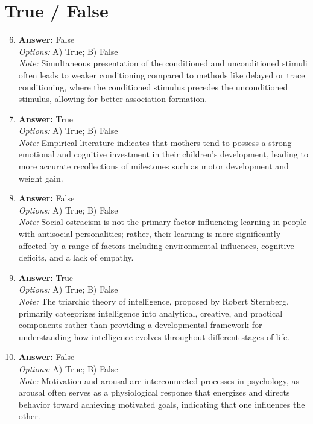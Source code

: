 \documentclass[12pt]{article}
\begin{document}
\section*{True / False}
\begin{enumerate}[label=\arabic*.]
\setcounter{enumi}{5}
\item \textbf{Answer:} False
\\ \textit{Options:} A) True; B) False
\\ \textit{Note:} Simultaneous presentation of the conditioned and unconditioned stimuli often leads to weaker conditioning compared to methods like delayed or trace conditioning, where the conditioned stimulus precedes the unconditioned stimulus, allowing for better association formation.
\item \textbf{Answer:} True
\\ \textit{Options:} A) True; B) False
\\ \textit{Note:} Empirical literature indicates that mothers tend to possess a strong emotional and cognitive investment in their children's development, leading to more accurate recollections of milestones such as motor development and weight gain.
\item \textbf{Answer:} False
\\ \textit{Options:} A) True; B) False
\\ \textit{Note:} Social ostracism is not the primary factor influencing learning in people with antisocial personalities; rather, their learning is more significantly affected by a range of factors including environmental influences, cognitive deficits, and a lack of empathy.
\item \textbf{Answer:} True
\\ \textit{Options:} A) True; B) False
\\ \textit{Note:} The triarchic theory of intelligence, proposed by Robert Sternberg, primarily categorizes intelligence into analytical, creative, and practical components rather than providing a developmental framework for understanding how intelligence evolves throughout different stages of life.
\item \textbf{Answer:} False
\\ \textit{Options:} A) True; B) False
\\ \textit{Note:} Motivation and arousal are interconnected processes in psychology, as arousal often serves as a physiological response that energizes and directs behavior toward achieving motivated goals, indicating that one influences the other.
\end{enumerate}
\end{document}
